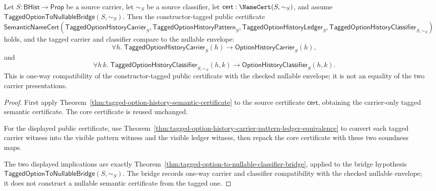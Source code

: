 \begin{theorem}
\label{thm:tagged-option-public-certificate-descends-to-nullable-envelope}
Let $S:\mathsf{BHist}\to\mathsf{Prop}$ be a source carrier, let $\sim_S$ be a
source classifier, let $\mathsf{cert}:\NameCert(S,\sim_S)$, and assume
$\mathsf{TaggedOptionToNullableBridge}(S,\sim_S)$. Then the constructor-tagged
public certificate
$$
\mathsf{SemanticNameCert}(\mathsf{TaggedOptionHistoryCarrier}_S,
\mathsf{TaggedOptionHistoryPattern}_S,
\mathsf{TaggedOptionHistoryLedger}_S,
\mathsf{TaggedOptionHistoryClassifier}_{S,\sim_S})
$$
holds, and the tagged carrier and classifier compare to the nullable envelope:
$$
\forall h.\;
\mathsf{TaggedOptionHistoryCarrier}_S(h)\to
\mathsf{OptionHistoryCarrier}_S(h),
$$
and
$$
\forall h\,k.\;
\mathsf{TaggedOptionHistoryClassifier}_{S,\sim_S}(h,k)\to
\mathsf{OptionHistoryClassifier}_S(h,k).
$$
This is one-way compatibility of the constructor-tagged public certificate with
the checked nullable envelope; it is not an equality of the two carrier
presentations.
\end{theorem}
\begin{proof}
First apply Theorem~\ref{thm:tagged-option-history-semantic-certificate} to the
source certificate $\mathsf{cert}$, obtaining the carrier-only tagged semantic
certificate. The core certificate is reused unchanged.

For the displayed public certificate, use
Theorem~\ref{thm:tagged-option-history-carrier-pattern-ledger-equivalence} to
convert each tagged carrier witness into the visible pattern witness and the
visible ledger witness, then repack the core certificate with these two
soundness maps.

The two displayed implications are exactly
Theorem~\ref{thm:tagged-option-to-nullable-classifier-bridge}, applied to the
bridge hypothesis $\mathsf{TaggedOptionToNullableBridge}(S,\sim_S)$. The bridge
records one-way carrier and classifier compatibility with the checked nullable
envelope; it does not construct a nullable semantic certificate from the tagged
one.
\end{proof}

